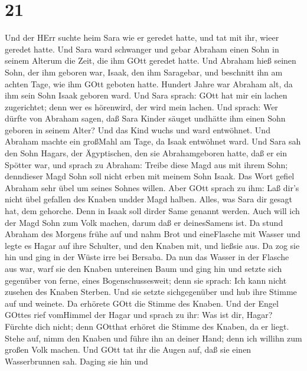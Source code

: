 \hypertarget{section-20}{%
\section{21}\label{section-20}}

 Und der HErr suchte heim Sara wie er geredet hatte, und tat
mit ihr, wieer geredet hatte.  Und Sara ward schwanger und
gebar Abraham einen Sohn in seinem Alterum die Zeit, die ihm GOtt
geredet hatte.  Und Abraham hieß seinen Sohn, der ihm
geboren war, Isaak, den ihm Saragebar,  und beschnitt ihn am
achten Tage, wie ihm GOtt geboten hatte.  Hundert Jahre war
Abraham alt, da ihm sein Sohn Isaak geboren ward.  Und Sara
sprach: GOtt hat mir ein lachen zugerichtet; denn wer es hörenwird, der
wird mein lachen.  Und sprach: Wer dürfte von Abraham sagen,
daß Sara Kinder säuget undhätte ihm einen Sohn geboren in seinem Alter?
 Und das Kind wuchs und ward entwöhnet. Und Abraham machte
ein großMahl am Tage, da Isaak entwöhnet ward.  Und Sara sah
den Sohn Hagars, der Ägyptischen, den sie Abrahamgeboren hatte, daß er
ein Spötter war,  und sprach zu Abraham: Treibe diese Magd
aus mit ihrem Sohn; denndieser Magd Sohn soll nicht erben mit meinem
Sohn Isaak.  Das Wort gefiel Abraham sehr übel um seines
Sohnes willen.  Aber GOtt sprach zu ihm: Laß dir's nicht
übel gefallen des Knaben undder Magd halben. Alles, was Sara dir gesagt
hat, dem gehorche. Denn in Isaak soll dirder Same genannt werden.
 Auch will ich der Magd Sohn zum Volk machen, darum daß er
deinesSamens ist.  Da stund Abraham des Morgens frühe auf
und nahm Brot und eineFlasche mit Wasser und legte es Hagar auf ihre
Schulter, und den Knaben mit, und ließsie aus. Da zog sie hin und ging
in der Wüste irre bei Bersaba.  Da nun das Wasser in der
Flasche aus war, warf sie den Knaben untereinen Baum  und
ging hin und setzte sich gegenüber von ferne, eines Bogenschussesweit;
denn sie sprach: Ich kann nicht zusehen des Knaben Sterben. Und sie
setzte sichgegenüber und hub ihre Stimme auf und weinete. 
Da erhörete GOtt die Stimme des Knaben. Und der Engel GOttes rief
vomHimmel der Hagar und sprach zu ihr: Was ist dir, Hagar? Fürchte dich
nicht; denn GOtthat erhöret die Stimme des Knaben, da er liegt.
 Stehe auf, nimm den Knaben und führe ihn an deiner Hand;
denn ich willihn zum großen Volk machen.  Und GOtt tat ihr
die Augen auf, daß sie einen Wasserbrunnen sah. Daging sie hin und
